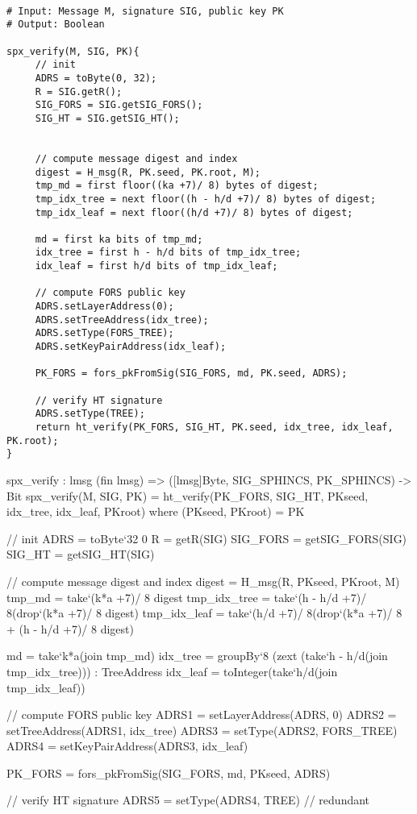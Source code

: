 \begin{lstlisting}[breaklines=true, label=alg:spx:ver, mathescape, language=pseudoc,
                   caption=\spxverify\ -- Verify a \spx signature \spxsig on a
   message \msg using a \spx public key \PK]

# Input: Message M, signature SIG, public key PK
# Output: Boolean

spx_verify(M, SIG, PK){
     // init
     ADRS = toByte(0, 32);
     R = SIG.getR();
     SIG_FORS = SIG.getSIG_FORS();
     SIG_HT = SIG.getSIG_HT();


     // compute message digest and index
     digest = H_msg(R, PK.seed, PK.root, M);
     tmp_md = first floor((ka +7)/ 8) bytes of digest;
     tmp_idx_tree = next floor((h - h/d +7)/ 8) bytes of digest;
     tmp_idx_leaf = next floor((h/d +7)/ 8) bytes of digest;

     md = first ka bits of tmp_md;
     idx_tree = first h - h/d bits of tmp_idx_tree;
     idx_leaf = first h/d bits of tmp_idx_leaf;

     // compute FORS public key
     ADRS.setLayerAddress(0);
     ADRS.setTreeAddress(idx_tree);
     ADRS.setType(FORS_TREE);
     ADRS.setKeyPairAddress(idx_leaf);

     PK_FORS = fors_pkFromSig(SIG_FORS, md, PK.seed, ADRS);

     // verify HT signature
     ADRS.setType(TREE);
     return ht_verify(PK_FORS, SIG_HT, PK.seed, idx_tree, idx_leaf, PK.root);
}
\end{lstlisting}

\begin{code}
  spx_verify : {lmsg} (fin lmsg) =>
    ([lmsg]Byte, SIG_SPHINCS, PK_SPHINCS) -> Bit
  spx_verify(M, SIG, PK) =
    ht_verify(PK_FORS, SIG_HT, PKseed, idx_tree, idx_leaf, PKroot)
    where
      (PKseed, PKroot) = PK

      // init
      ADRS = toByte`{32} 0
      R = getR(SIG)
      SIG_FORS = getSIG_FORS(SIG)
      SIG_HT = getSIG_HT(SIG)

      // compute message digest and index
      digest = H_msg(R, PKseed, PKroot, M)
      tmp_md =
        take`{(k*a +7)/ 8} digest
      tmp_idx_tree =
        take`{(h - h/d +7)/ 8}(drop`{(k*a +7)/ 8} digest)
      tmp_idx_leaf =
        take`{(h/d +7)/ 8}(drop`{(k*a +7)/ 8 + (h - h/d +7)/ 8} digest)

      md = take`{k*a}(join tmp_md)
      idx_tree =
        groupBy`{8} (zext (take`{h - h/d}(join tmp_idx_tree))) : TreeAddress
      idx_leaf = toInteger(take`{h/d}(join tmp_idx_leaf))

      // compute FORS public key
      ADRS1 = setLayerAddress(ADRS, 0)
      ADRS2 = setTreeAddress(ADRS1, idx_tree)
      ADRS3 = setType(ADRS2, FORS_TREE)
      ADRS4 = setKeyPairAddress(ADRS3, idx_leaf)

      PK_FORS = fors_pkFromSig(SIG_FORS, md, PKseed, ADRS)

      // verify HT signature
      ADRS5 = setType(ADRS4, TREE) // redundant
\end{code}

